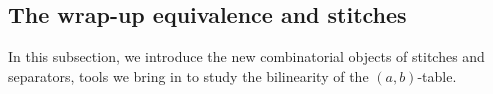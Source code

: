\documentclass[a4paper,12pt]{article}
\newtheorem{lem}[thm]{Lemma}
\begin{document}






%




\subsection{The wrap-up equivalence and stitches}

In this subsection, we introduce the new combinatorial objects of stitches and separators, tools we bring in to study the bilinearity of the $(a,b)$-table.


\end{document}
